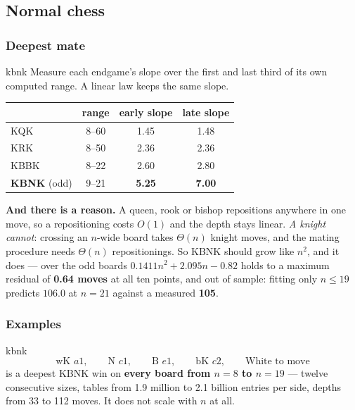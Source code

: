 \documentclass[10pt]{article}
\begin{document}
\subsection{Normal chess}\label{sub:kbnk-chess}

\subsubsection{Deepest mate}\label{sub:kbnk-law}

\begin{result}[title={KBNK is the only one that bends}]{kbnk}
Measure each endgame's slope over the first and last third of its own computed
range. A linear law keeps the same slope.

\smallskip
\begin{center}\small
\begin{tabular}{@{}lccc@{}}
\toprule
 & range & early slope & late slope \\
\midrule
KQK  & 8--60 & 1.45 & 1.48 \\
KRK  & 8--50 & 2.36 & 2.36 \\
KBBK & 8--22 & 2.60 & 2.80 \\
\textbf{KBNK} (odd) & 9--21 & \textbf{5.25} & \textbf{7.00} \\
\bottomrule
\end{tabular}
\end{center}

\smallskip
\textbf{And there is a reason.} A queen, rook or bishop repositions anywhere in
one move, so a repositioning costs $O(1)$ and the depth stays linear. \emph{A
knight cannot}: crossing an $n$-wide board takes $\Theta(n)$ knight moves, and
the mating procedure needs $\Theta(n)$ repositionings. So KBNK should grow like
$n^2$, and it does --- over the odd boards $0.1411n^2+2.095n-0.82$ holds to a
maximum residual of \textbf{0.64 moves} at all ten points, and out of sample:
fitting only $n\le19$ predicts $106.0$ at $n=21$ against a measured
\textbf{105}.
\end{result}

\subsubsection{Examples}\label{sub:kbnk-family}

\begin{result}[title={A single fixed position, unchanged for all $n$}]{kbnk}
\[ \text{wK }a1,\qquad \text{N }c1,\qquad \text{B }e1,\qquad \text{bK }c2,
   \qquad \text{White to move} \]
is a deepest KBNK win on \textbf{every board from $n=8$ to $n=19$} --- twelve
consecutive sizes, tables from 1.9 million to 2.1 billion entries per side,
depths from 33 to 112 moves. It does not scale with $n$ at all.
\end{result}
\end{document}
